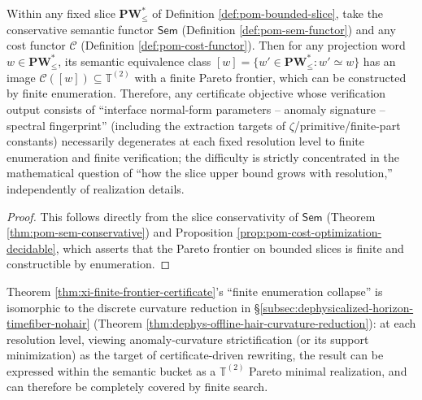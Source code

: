 \begin{theorem}\label{thm:xi-finite-frontier-certificate}
Within any fixed slice \(\mathbf{PW}^{\ast}_{\le}\) of Definition \ref{def:pom-bounded-slice}, take the conservative semantic functor \(\mathsf{Sem}\) (Definition \ref{def:pom-sem-functor}) and any cost functor \(\mathcal{C}\) (Definition \ref{def:pom-cost-functor}).
Then for any projection word \(w\in \mathbf{PW}^{\ast}_{\le}\), its semantic equivalence class
\(
[w]=\{w'\in\mathbf{PW}^{\ast}_{\le}:w'\simeq w\}
\)
has an image \(\mathcal{C}([w])\subseteq \mathbb{T}^{(2)}\) with a finite Pareto frontier, which can be constructed by finite enumeration.
Therefore, any certificate objective whose verification output consists of ``interface normal-form parameters -- anomaly signature -- spectral fingerprint'' (including the extraction targets of \(\zeta\)/primitive/finite-part constants) necessarily degenerates at each fixed resolution level to finite enumeration and finite verification; the difficulty is strictly concentrated in the mathematical question of ``how the slice upper bound grows with resolution,'' independently of realization details.
\end{theorem}

\begin{proof}
This follows directly from the slice conservativity of \(\mathsf{Sem}\) (Theorem \ref{thm:pom-sem-conservative}) and Proposition \ref{prop:pom-cost-optimization-decidable}, which asserts that the Pareto frontier on bounded slices is finite and constructible by enumeration.
\end{proof}

Theorem \ref{thm:xi-finite-frontier-certificate}'s ``finite enumeration collapse'' is isomorphic to the discrete curvature reduction in \S\ref{subsec:dephysicalized-horizon-timefiber-nohair} (Theorem \ref{thm:dephys-offline-hair-curvature-reduction}): at each resolution level, viewing anomaly-curvature strictification (or its support minimization) as the target of certificate-driven rewriting, the result can be expressed within the semantic bucket as a \(\mathbb{T}^{(2)}\) Pareto minimal realization, and can therefore be completely covered by finite search.

